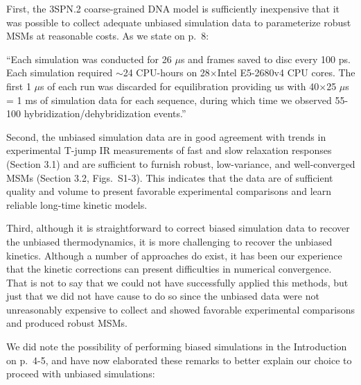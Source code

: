 \documentclass[11pt,a4paper]{letter} %
\begin{document}
First, the 3SPN.2 coarse-grained DNA model is sufficiently inexpensive that it was possible to collect adequate unbiased simulation data to parameterize robust MSMs at reasonable costs. As we state on p.~8: 

``Each simulation was conducted for 26 $\mu$s and frames saved to disc every 100 ps. Each simulation required $\sim$24 CPU-hours on 28$\times$Intel E5-2680v4 CPU cores. The first 1 $\mu$s of each run was discarded for equilibration providing us with 40$\times$25 $\mu$s = 1 ms of simulation data for each sequence, during which time we observed 55-100 hybridization/dehybridization events.''

Second, the unbiased simulation data are in good agreement with trends in experimental T-jump IR measurements of fast and slow relaxation responses (Section 3.1) and are sufficient to furnish robust, low-variance, and well-converged MSMs (Section 3.2, Figs.~S1-3). This indicates that the data are of sufficient quality and volume to present favorable experimental comparisons and learn reliable long-time kinetic models.

Third, although it is straightforward to correct biased simulation data to recover the unbiased thermodynamics, it is more challenging to recover the unbiased kinetics. Although a number of approaches do exist, it has been our experience that the kinetic corrections can present difficulties in numerical convergence. That is not to say that we could not have successfully applied this methods, but just that we did not have cause to do so since the unbiased data were not unreasonably expensive to collect and showed favorable experimental comparisons and produced robust MSMs.

We did note the possibility of performing biased simulations in the Introduction on p.~4-5, and have now elaborated these remarks to better explain our choice to proceed with unbiased simulations:
\end{document}

